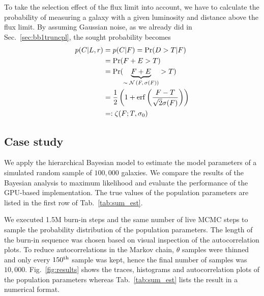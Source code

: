 To take the selection effect of the flux limit into account, we have to calculate the probability of measuring a galaxy with a given luminosity and distance above the flux limit.
By assuming Gaussian noise, as we already did in Sec.~\ref{sec:bb1truncpl}, the sought probability becomes
\begin{align}
p(C | L, r) &= p(C | F) = \Pr(D>T | F)\\
&= \Pr(F+E>T)\\
&=\Pr(\underbrace{F + E}_\text{$\sim \mathcal{N}\left(F,\sigma(F)\right)$} > T)\\
&=\frac{1}{2}\left( 1 + \operatorname{erf}\left( \frac{F - T}{\sqrt{2}\sigma(F)} \right) \right)\\
&=:\zeta(F ; T,\sigma_0)
\label{eq:pclr}
\end{align}
\fi


\subsection{Case study}

We apply the hierarchical Bayesian model to estimate the model parameters of a simulated random sample of $100{,}000$ galaxies.
We compare the results of the Bayesian analysis to maximum likelihood and evaluate the performance of the GPU-based implementation.
The true values of the population parameters are listed in the first row of Tab.~\ref{tab:sum_est}.

We executed 1.5M burn-in steps and the same number of live MCMC steps to sample the probability distribution of the population parameters.
The length of the burn-in sequence was chosen based on visual inspection of the autocorrelation plots.
To reduce autocorrelations in the Markov chain, $\theta$ samples were thinned and only every $150^\textnormal{th}$ sample was kept, hence the final number of samples was $10{,}000$.
Fig.~\ref{fig:results} shows the traces, histograms and autocorrelation plots of the population parameters whereas Tab.~\ref{tab:sum_est} lists the result in a numerical format.

